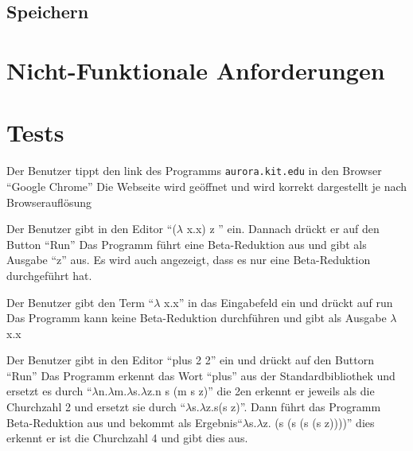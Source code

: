 \documentclass[parskip=full,11pt,twoside]{scrartcl}
\begin{document}
\subsection{Speichern}




\section{Nicht-Funktionale Anforderungen}





\section{Tests}


{Der Benutzer tippt den link des Programms \texttt{aurora.kit.edu} in den Browser \enquote {Google Chrome} }
{ Die Webseite wird geöffnet und wird korrekt dargestellt je nach Browserauflösung}

{ Der Benutzer gibt in den Editor \enquote {($\lambda$ x.x) z } ein. Dannach drückt er auf den Button \enquote {Run}}
{ Das Programm führt eine Beta-Reduktion aus und gibt als Ausgabe \enquote {z} aus. Es wird auch angezeigt, dass es nur eine Beta-Reduktion durchgeführt hat.}

{Der Benutzer gibt den Term \enquote {$\lambda$ x.x} in das Eingabefeld ein und drückt auf run}
{Das Programm kann keine Beta-Reduktion durchführen und gibt als Ausgabe $\lambda$ x.x}

{Der Benutzer gibt in den Editor \enquote {plus 2 2} ein und drückt auf den Buttorn \enquote {Run}}
{ Das Programm erkennt das Wort \enquote {plus} aus der Standardbibliothek und ersetzt es durch \enquote {$\lambda$n.$\lambda$m.$\lambda$s.$\lambda$z.n s (m s z)} die 2en erkennt er jeweils als die Churchzahl 2 und ersetzt sie durch \enquote {$\lambda$s.$\lambda$z.s(s z)}. Dann führt das Programm Beta-Reduktion aus und bekommt als Ergebnis\enquote {$\lambda$s.$\lambda$z. (s (s (s (s z))))} dies erkennt er ist die Churchzahl 4 und gibt dies aus. }
\end{document}
